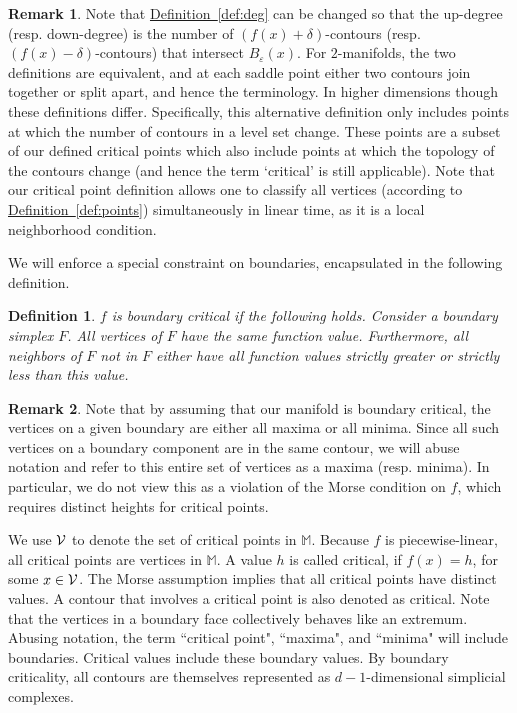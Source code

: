 \documentclass[11pt]{article}
\newtheorem{definition}[theorem]{Definition}
\theoremstyle{definition}
\newtheorem{remark}{Remark}
\newcommand{\cV}{{\cal V}}
\newcommand{\MM}{\mathbb{M}}
\newcommand{\eps}{\varepsilon}
\newcommand{\Def}[1]{\hyperref[def:#1]{Definition~\ref*{def:#1}}} %
\begin{document}
\begin{remark}
 Note that \Def{deg} can be changed so that the up-degree (resp. down-degree) is the number of $(f(x) + \delta)$-contours (resp. $(f(x) - \delta)$-contours) that intersect $B_\eps(x)$.
 For $2$-manifolds, the two definitions are equivalent, and at each saddle point either two contours join together or split apart, and hence the terminology.  
 In higher dimensions though these definitions differ.  Specifically, this alternative definition only includes points at which the number of contours in a level set change.
 These points are a subset of our defined critical points which also include points at which the topology of the contours change (and hence the term `critical' is still applicable).
 Note that our critical point definition allows one to classify all vertices (according to \Def{points}) simultaneously in linear time, as it is a local neighborhood condition.
\end{remark}



We will enforce a special constraint on boundaries, encapsulated in the following definition.

\begin{definition} \label{def:bound} $f$ is \emph{boundary critical} if the following holds.
Consider a boundary simplex $F$. All vertices of $F$ have the same function value. Furthermore, all
neighbors of $F$ not in $F$ either have all function values strictly greater or strictly less
than this value.
\end{definition}

\begin{remark}
Note that by assuming that our manifold is boundary critical, the vertices on a given boundary are either all maxima or all minima.  
Since all such vertices on a boundary component are in the same contour, we will abuse notation and refer to this entire set of vertices as a maxima (resp. minima).
In particular, we do not view this as a violation of the Morse condition on $f$, which requires distinct heights for critical points.
\end{remark}

We use $\cV$ to denote the set of critical points in $\MM$.
Because $f$ is piecewise-linear, all critical points are vertices in $\MM$. 
A value $h$ is called critical, if $f(x) = h$, for some $x \in \cV$. The Morse assumption
implies that all critical points have distinct values. A contour that involves a critical
point is also denoted as critical. Note that the vertices in a boundary face collectively behaves like an extremum.
Abusing notation, the term ``critical point", ``maxima", and ``minima" will include boundaries.
Critical values include these boundary values. By boundary criticality, all contours are themselves
represented as $d-1$-dimensional simplicial complexes.
\end{document}
